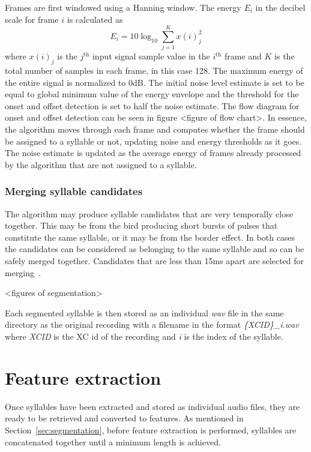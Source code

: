 Frames are first windowed using a Hanning window. The energy $E_i$ in the
decibel scale for frame $i$ is calculated as
\begin{equation}
  E_i = 10 \log_{10} \sum_{j=1}^{K} x{(i)}_{j}^2
\end{equation}
where $x{(i)}_j$ is the $j^{\text{th}}$ input signal sample value in the
$i^{\text{th}}$ frame and $K$ is the total number of samples in each frame, in
this case 128. The maximum energy of the entire signal is normalized to 0dB. The
initial noise level estimate is set to be equal to global minimum value of the
energy envelope and the threshold for the onset and offset detection is set to
half the noise estimate. The flow diagram for onset and offset detection can be
seen in figure <figure of flow chart>. In essence, the algorithm moves through
each frame and computes whether the frame should be assigned to a syllable or
not, updating noise and energy thresholds as it goes. The noise estimate is
updated as the average energy of frames already processed by the algorithm that
are not assigned to a syllable.

\subsubsection{Merging syllable candidates}

The algorithm may produce syllable candidates that are very temporally close
together. This may be from the bird producing short bursts of pulses that
constitute the same syllable, or it may be from the border effect. In both cases
the candidates can be considered as belonging to the same syllable and so can be
safely merged together. Candidates that are less than 15ms apart are selected
for merging~\cite{fagerlund2004automatic}.

<figures of segmentation>

Each segmented syllable is then stored as an individual \textit{wav} file in the
same directory as the original recording with a filename in the format 
\textit{\{XCID\}\_i.wav} where \textit{XCID} is the XC id of the recording and
\textit{i} is the index of the syllable.

\section{Feature extraction}

Once syllables have been extracted and stored as individual audio files, they
are ready to be retrieved and converted to features. As mentioned in
Section~\ref{sec:segmentation}, before feature extraction is performed,
syllables are concatenated together until a minimum length is achieved.

